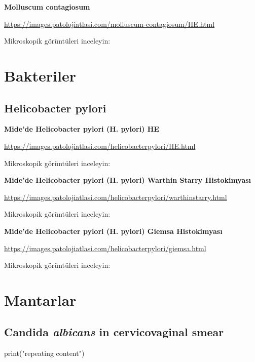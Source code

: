 \documentclass[
  letterpaper,
  DIV=11,
  numbers=noendperiod]{scrreprt}
\newenvironment{Shaded}{}{}
\newcommand{\FunctionTok}[1]{\textcolor[rgb]{0.02,0.16,0.49}{#1}}
\newcommand{\NormalTok}[1]{#1}
\newcommand{\StringTok}[1]{\textcolor[rgb]{0.25,0.44,0.63}{#1}}
\begin{document}
\textbf{Molluscum contagiosum}

\url{https://images.patolojiatlasi.com/molluscum-contagiosum/HE.html}

Mikroskopik görüntüleri inceleyin:

\hypertarget{bakteriler}{%
\chapter{Bakteriler}\label{bakteriler}}

\hypertarget{helicobacter-pylori}{%
\section{Helicobacter pylori}\label{helicobacter-pylori}}

\textbf{Mide'de Helicobacter pylori (H. pylori) HE}

\url{https://images.patolojiatlasi.com/helicobacterpylori/HE.html}

Mikroskopik görüntüleri inceleyin:

\textbf{Mide'de Helicobacter pylori (H. pylori) Warthin Starry
Histokimyası}

\url{https://images.patolojiatlasi.com/helicobacterpylori/warthinstarry.html}

Mikroskopik görüntüleri inceleyin:

\textbf{Mide'de Helicobacter pylori (H. pylori) Giemsa Histokimyası}

\url{https://images.patolojiatlasi.com/helicobacterpylori/giemsa.html}

Mikroskopik görüntüleri inceleyin:

\hypertarget{mantarlar}{%
\chapter{Mantarlar}\label{mantarlar}}

\hypertarget{candida-albicans-in-cervicovaginal-smear}{%
\section{\texorpdfstring{Candida \emph{albicans} in cervicovaginal
smear}{Candida albicans in cervicovaginal smear}}\label{candida-albicans-in-cervicovaginal-smear}}

\begin{Shaded}
\begin{Highlighting}[]
\FunctionTok{print}\NormalTok{(}\StringTok{"repeating content"}\NormalTok{)}
\end{Highlighting}
\end{Shaded}
\end{document}
